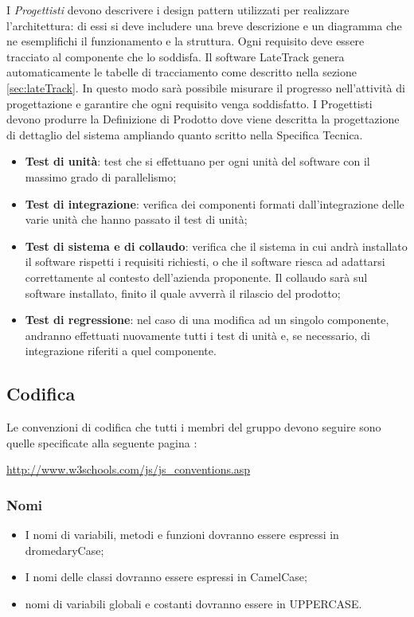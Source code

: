 	I \textit{Progettisti} devono descrivere i design pattern utilizzati per realizzare l'architettura:
	di essi si deve includere una breve descrizione e un diagramma che ne esemplifichi il funzionamento e la struttura.
	Ogni requisito deve essere tracciato al componente che lo soddisfa. Il software LateTrack genera automaticamente le tabelle di tracciamento come descritto nella sezione \ref{sec:lateTrack}. In questo modo sarà possibile misurare il progresso nell'attività di progettazione e garantire che ogni requisito venga soddisfatto.
	I Progettisti devono produrre la Definizione di Prodotto dove viene descritta la progettazione di dettaglio del sistema ampliando quanto scritto nella Specifica Tecnica.
	

	\begin{itemize}
	
	
\item \textbf{Test di unità}: test che si effettuano per ogni unità del software con il massimo grado di parallelismo;
\item \textbf{Test di integrazione}: verifica dei componenti formati dall’integrazione delle varie unità che hanno passato il test di unità;
\item \textbf{Test di sistema e di collaudo}: verifica che il sistema in cui andrà installato il software rispetti i requisiti richiesti, o che il software riesca ad adattarsi correttamente al contesto dell’azienda proponente. Il collaudo sarà sul software installato, finito il quale avverrà il rilascio del prodotto;
\item \textbf{Test di regressione}: nel caso di una modifica ad un singolo componente,
andranno effettuati nuovamente tutti i test di unità e, se necessario, di
integrazione riferiti a quel componente.
\end{itemize}

	
	\subsection{Codifica}
	Le convenzioni di codifica che tutti i membri del gruppo devono seguire sono quelle
	specificate alla seguente pagina :\\
	\begin{center} \url{http://www.w3schools.com/js/js_conventions.asp} \end{center}
	\subsubsection{Nomi}
	\begin{itemize}
	\item I nomi di variabili, metodi e funzioni dovranno essere espressi in dromedaryCase;
	\item I nomi delle classi dovranno essere espressi in CamelCase;
	\item nomi di variabili globali e costanti dovranno essere in UPPERCASE.
	\end{itemize}
